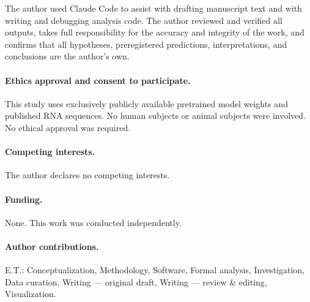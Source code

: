 \documentclass[11pt]{article}
\begin{document}
The author used Claude Code \citep{anthropic2025claude} to assist with
drafting manuscript text and with writing and debugging analysis code.
The author reviewed and verified all outputs, takes full responsibility
for the accuracy and integrity of the work, and confirms that all
hypotheses, preregistered predictions, interpretations, and conclusions
are the author's own.

\paragraph{Ethics approval and consent to participate.}
This study uses exclusively publicly available pretrained model weights
and published RNA sequences. No human subjects or animal subjects were
involved. No ethical approval was required.

\paragraph{Competing interests.} The author declares no competing interests.

\paragraph{Funding.} None. This work was conducted independently.

\paragraph{Author contributions.} E.T.: Conceptualization, Methodology,
Software, Formal analysis, Investigation, Data curation, Writing ---
original draft, Writing --- review \& editing, Visualization.




\end{document}
